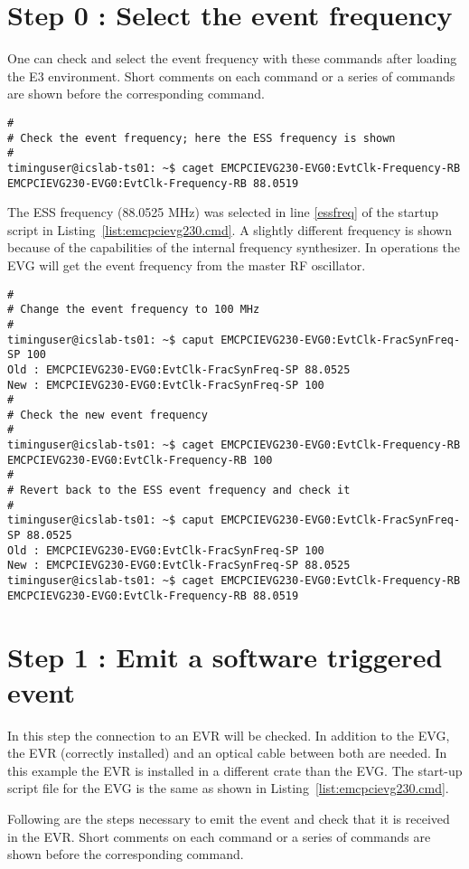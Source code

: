 \documentclass[11pt
  , a4paper
  , article
  , oneside
  , showtrims
]{memoir}
\begin{document}
\section{Step 0 : Select the event frequency}
One can check and select the event frequency with these commands after loading the E3 environment. Short comments on each command or a series of commands are shown before the corresponding command.
\begin{lstlisting}[style=termstyle]
#
# Check the event frequency; here the ESS frequency is shown
#
timinguser@icslab-ts01: ~$ caget EMCPCIEVG230-EVG0:EvtClk-Frequency-RB
EMCPCIEVG230-EVG0:EvtClk-Frequency-RB 88.0519
\end{lstlisting}
The ESS frequency (88.0525 MHz) was selected in line \ref{essfreq} of the startup script in Listing~\ref{list:emcpcievg230.cmd}. A slightly different frequency is shown because of the capabilities of the internal frequency synthesizer. In operations the EVG will get the event frequency from the master RF oscillator.
\begin{lstlisting}[style=termstyle]
#
# Change the event frequency to 100 MHz
#
timinguser@icslab-ts01: ~$ caput EMCPCIEVG230-EVG0:EvtClk-FracSynFreq-SP 100
Old : EMCPCIEVG230-EVG0:EvtClk-FracSynFreq-SP 88.0525
New : EMCPCIEVG230-EVG0:EvtClk-FracSynFreq-SP 100
#
# Check the new event frequency
#
timinguser@icslab-ts01: ~$ caget EMCPCIEVG230-EVG0:EvtClk-Frequency-RB
EMCPCIEVG230-EVG0:EvtClk-Frequency-RB 100
#
# Revert back to the ESS event frequency and check it
#
timinguser@icslab-ts01: ~$ caput EMCPCIEVG230-EVG0:EvtClk-FracSynFreq-SP 88.0525
Old : EMCPCIEVG230-EVG0:EvtClk-FracSynFreq-SP 100
New : EMCPCIEVG230-EVG0:EvtClk-FracSynFreq-SP 88.0525
timinguser@icslab-ts01: ~$ caget EMCPCIEVG230-EVG0:EvtClk-Frequency-RB
EMCPCIEVG230-EVG0:EvtClk-Frequency-RB 88.0519
\end{lstlisting}

\section{Step 1 : Emit a software triggered event}
In this step the connection to an EVR will be checked. In addition to the EVG, the EVR (correctly installed) and an optical cable between both are needed. In this example the EVR is installed in a different crate than the EVG. The start-up script file for the EVG is the same as shown in Listing~\ref{list:emcpcievg230.cmd}.

Following are the steps necessary to emit the event and check that it is received in the EVR. Short comments on each command or a series of commands are shown before the corresponding command.
\end{document}
